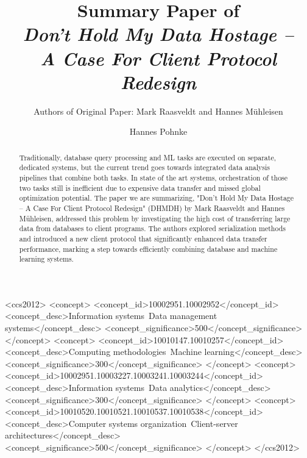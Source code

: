 \documentclass[sigconf]{acmart}
\begin{document}
\title{Summary Paper of \\ \textit{Don’t Hold My Data Hostage – \\A Case For Client Protocol Redesign}}
\subtitle{Authors of Original Paper: Mark Raasveldt and Hannes Mühleisen}


\author{Hannes Pohnke}


\begin{abstract}
Traditionally, database query processing and ML tasks are executed on separate, dedicated systems, but the current trend goes towards integrated data analysis pipelines that combine both tasks. In state of the art systems, orchestration of those two tasks still is inefficient due to expensive data transfer and missed global optimization potential. The paper we are summarizing, "Don’t Hold My Data Hostage – A Case For Client Protocol Redesign" (DHMDH) by Mark Raasveldt and Hannes Mühleisen, addressed this problem by investigating the high cost of transferring large data from databases to client programs. The authors explored serialization methods and introduced a new client protocol that significantly enhanced data transfer performance, marking a step towards efficiently combining database and machine learning systems.
\end{abstract}

\begin{CCSXML}
<ccs2012>
<concept>
<concept_id>10002951.10002952</concept_id>
<concept_desc>Information systems~Data management systems</concept_desc>
<concept_significance>500</concept_significance>
</concept>
<concept>
<concept_id>10010147.10010257</concept_id>
<concept_desc>Computing methodologies~Machine learning</concept_desc>
<concept_significance>300</concept_significance>
</concept>
<concept>
<concept_id>10002951.10003227.10003241.10003244</concept_id>
<concept_desc>Information systems~Data analytics</concept_desc>
<concept_significance>300</concept_significance>
</concept>
<concept>
<concept_id>10010520.10010521.10010537.10010538</concept_id>
<concept_desc>Computer systems organization~Client-server architectures</concept_desc>
<concept_significance>500</concept_significance>
</concept>
</ccs2012>
\end{CCSXML}
\end{document}
